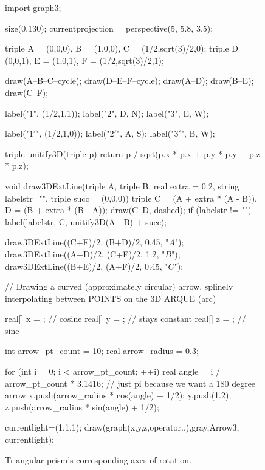 \documentclass[../textbook.tex]{subfiles}
\begin{document}
\begin{figure}[h]
	\begin{center}
		\begin{minipage}[b]{\textwidth}
			\centering
			\begin{asy}[width=0.5\textwidth]
				import graph3;

				size(0,130);
				currentprojection = perspective(5, 5.8, 3.5);

				triple A = (0,0,0), B = (1,0,0), C = (1/2,sqrt(3)/2,0);
				triple D = (0,0,1), E = (1,0,1), F = (1/2,sqrt(3)/2,1);

				draw(A--B--C--cycle);
				draw(D--E--F--cycle);
				draw(A--D);
				draw(B--E);
				draw(C--F);

				label("$1$", (1/2,1,1));
				label("$2$", D, N);
				label("$3$", E, W);

				label("$1'$", (1/2,1,0));
				label("$2'$", A, S);
				label("$3'$", B, W);

				triple unitify3D(triple p) {
					return p / sqrt(p.x * p.x + p.y * p.y + p.z * p.z);
				}

				void draw3DExtLine(triple A, triple B, real extra = 0.2, string labelstr="", triple succ = (0,0,0)) {
					triple C = (A + extra * (A - B)), D = (B + extra * (B - A));
					draw(C--D, dashed);
					if (labelstr != "") label(labelstr, C, unitify3D(A - B) + succ);
				}

				draw3DExtLine((C+F)/2, (B+D)/2, 0.45, "$A$");
				draw3DExtLine((A+D)/2, (C+E)/2, 1.2, "$B$");
				draw3DExtLine((B+E)/2, (A+F)/2, 0.45, "$C$");

				// Drawing a curved (approximately circular) arrow, splinely interpolating between POINTS on the 3D ARQUE (arc)

				real[] x = {}; // cosine
				real[] y = {}; // stays constant
				real[] z = {}; // sine

				int arrow_pt_count = 10;
				real arrow_radius = 0.3;

				for (int i = 0; i < arrow_pt_count; ++i) {
					real angle = i / arrow_pt_count * 3.1416; // just pi because we want a 180 degree arrow
					x.push(arrow_radius * cos(angle) + 1/2);
					y.push(1.2);
					z.push(arrow_radius * sin(angle) + 1/2);
				}

				currentlight=(1,1,1);
				draw(graph(x,y,z,operator..),gray,Arrow3, currentlight);
			\end{asy}
		\end{minipage}
	\end{center}
	\vspace*{-2\baselineskip}
	\begin{center}
		\begin{minipage}[t]{\textwidth}
			\caption{Triangular prism's corresponding axes of rotation.}
			\label{fig:tri_prism_rot}
		\end{minipage}
	\end{center}
	\vspace*{-2\baselineskip}
\end{figure}
\end{document}

